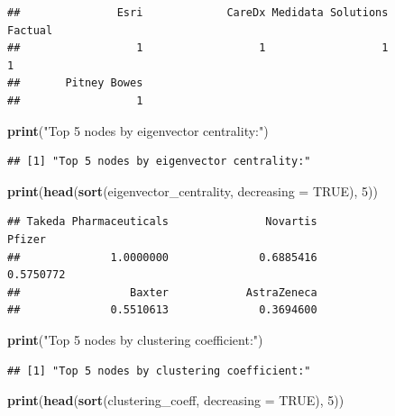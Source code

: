 \documentclass[
]{article}
\newenvironment{Shaded}{\begin{snugshade}}{\end{snugshade}}
\newcommand{\AttributeTok}[1]{\textcolor[rgb]{0.13,0.29,0.53}{#1}}
\newcommand{\ConstantTok}[1]{\textcolor[rgb]{0.56,0.35,0.01}{#1}}
\newcommand{\DecValTok}[1]{\textcolor[rgb]{0.00,0.00,0.81}{#1}}
\newcommand{\FunctionTok}[1]{\textcolor[rgb]{0.13,0.29,0.53}{\textbf{#1}}}
\newcommand{\NormalTok}[1]{#1}
\newcommand{\StringTok}[1]{\textcolor[rgb]{0.31,0.60,0.02}{#1}}
\begin{document}
\begin{verbatim}
##               Esri             CareDx Medidata Solutions            Factual 
##                  1                  1                  1                  1 
##       Pitney Bowes 
##                  1
\end{verbatim}

\begin{Shaded}
\begin{Highlighting}[]
\FunctionTok{print}\NormalTok{(}\StringTok{"Top 5 nodes by eigenvector centrality:"}\NormalTok{)}
\end{Highlighting}
\end{Shaded}

\begin{verbatim}
## [1] "Top 5 nodes by eigenvector centrality:"
\end{verbatim}

\begin{Shaded}
\begin{Highlighting}[]
\FunctionTok{print}\NormalTok{(}\FunctionTok{head}\NormalTok{(}\FunctionTok{sort}\NormalTok{(eigenvector\_centrality, }\AttributeTok{decreasing =} \ConstantTok{TRUE}\NormalTok{), }\DecValTok{5}\NormalTok{))}
\end{Highlighting}
\end{Shaded}

\begin{verbatim}
## Takeda Pharmaceuticals               Novartis                 Pfizer 
##              1.0000000              0.6885416              0.5750772 
##                 Baxter            AstraZeneca 
##              0.5510613              0.3694600
\end{verbatim}

\begin{Shaded}
\begin{Highlighting}[]
\FunctionTok{print}\NormalTok{(}\StringTok{"Top 5 nodes by clustering coefficient:"}\NormalTok{)}
\end{Highlighting}
\end{Shaded}

\begin{verbatim}
## [1] "Top 5 nodes by clustering coefficient:"
\end{verbatim}

\begin{Shaded}
\begin{Highlighting}[]
\FunctionTok{print}\NormalTok{(}\FunctionTok{head}\NormalTok{(}\FunctionTok{sort}\NormalTok{(clustering\_coeff, }\AttributeTok{decreasing =} \ConstantTok{TRUE}\NormalTok{), }\DecValTok{5}\NormalTok{))}
\end{Highlighting}
\end{Shaded}
\end{document}
